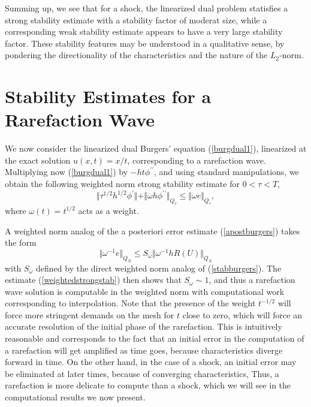 Summing up, we see that for a shock, the linearized dual problem statisfies a strong
stability estimate with a stability factor of moderat size, while
a corresponding weak stability estimate appears to have a very large
stability factor. These stability features may be understood in a qualitative
sense, by pondering the directionality of the characteristics and the nature
of the $L_2$-norm. 

\section{Stability Estimates for a Rarefaction Wave}

We now consider the linearized dual Burgers' equation (\ref{burgdual1}),
linearized at the exact solution $u(x,t)=x/t$, corresponding to a rarefaction wave. 
Multiplying now (\ref{burgdual1}) by 
$-ht\phi^{\prime\prime}$, and using standard manipulations,
we obtain the following weighted norm strong stability estimate for $0<\tau <T$,
\begin{equation}\label{weightedstrongstab}
\Vert\tau^{1/2}h^{1/2}\phi^\prime\Vert 
+\Vert \omega h\phi^{\prime\prime}\Vert_{Q_\tau }
\leq \Vert \omega e\Vert_{Q_\tau } ,
\end{equation}
where $\omega (t)=t^{1/2}$ acts as a weight. 

A weighted norm analog of the a posteriori error estimate (\ref{apostburgers}) takes the form
\begin{equation}\label{weightedapostburger}
\Vert \omega^{-1} e\Vert_{Q_N}\le S_\omega\Vert \omega^{-1} hR(U)\Vert_{Q_N}
\end{equation}
with $S_\omega$ defined by the direct weighted norm analog of (\ref{stabburgers}).
The estimate (\ref{weightedstrongstab}) then shows that $S_\omega \sim 1$, 
and thus a rarefaction wave solution is computable in the weighted
norm with computational work corresponding to interpolation.
Note that the presence of the weight $t^{-1/2}$ will force more
stringent demands on the mesh for $t$ close to zero, which will
force an accurate resolution of the initial phase of the rarefaction.
This is intuitively reasonable and corresponds to the fact that an initial
error in the computation of a rarefaction will get amplified as time goes,
because characteristics diverge forward in time. On the other hand,
in the case of a shock, an initial error may be eliminated at later times,
because of converging characteristics, Thus, a rarefaction is more delicate
to compute than a shock, which we will see in the computational results 
we now present.





